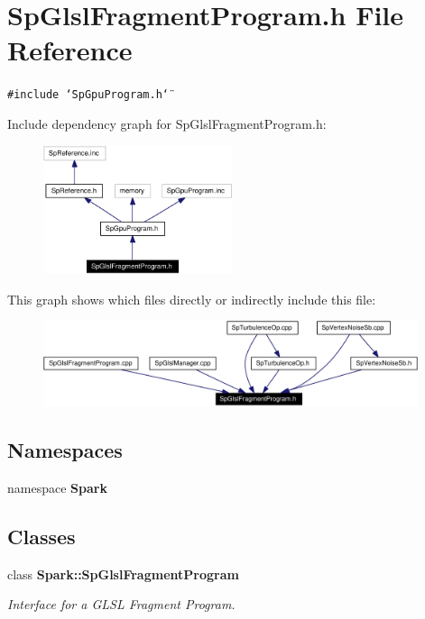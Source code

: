\section{Sp\-Glsl\-Fragment\-Program.h File Reference}
\label{SpGlslFragmentProgram_8h}
{\tt \#include \char`\"{}Sp\-Gpu\-Program.h\char`\"{}}\par


Include dependency graph for Sp\-Glsl\-Fragment\-Program.h:\begin{figure}[H]
\begin{center}
\leavevmode
\includegraphics[width=157pt]{SpGlslFragmentProgram_8h__incl}
\end{center}
\end{figure}


This graph shows which files directly or indirectly include this file:\begin{figure}[H]
\begin{center}
\leavevmode
\includegraphics[width=311pt]{SpGlslFragmentProgram_8h__dep__incl}
\end{center}
\end{figure}
\subsection*{Namespaces}
\begin{CompactItemize}
\item 
namespace {\bf Spark}
\end{CompactItemize}
\subsection*{Classes}
\begin{CompactItemize}
\item 
class {\bf Spark::Sp\-Glsl\-Fragment\-Program}
\begin{CompactList}\small\item\em Interface for a GLSL Fragment Program. \item\end{CompactList}\end{CompactItemize}
